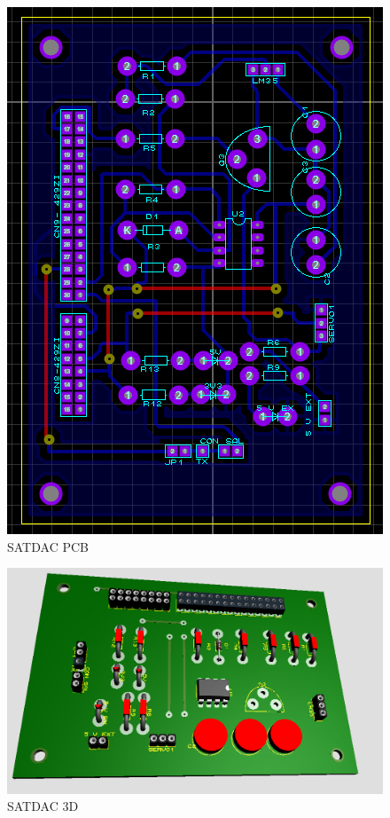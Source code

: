 \documentclass[conference]{IEEEtran}
\begin{document}
\begin{figure}[htbp]
\centering
\includegraphics[width=.9\linewidth]{../../images/cuboPCB.png}
\caption{\label{fig:cuboPCB}SATDAC PCB}
\end{figure}

\begin{figure}[htbp]
\centering
\includegraphics[width=.9\linewidth]{../../images/cubo3D.png}
\caption{\label{fig:cubo3D}SATDAC 3D}
\end{figure}
\end{document}
